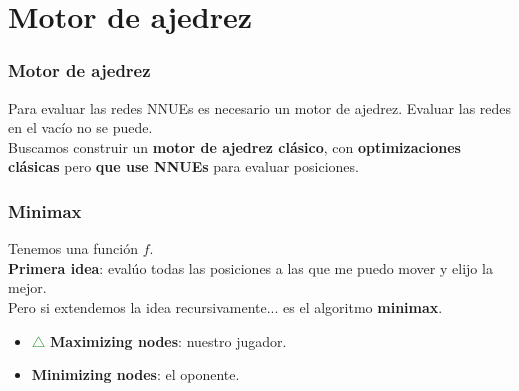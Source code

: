 
\section{Motor de ajedrez}

\begin{frame}
\frametitle{Motor de ajedrez}
Para evaluar las redes NNUEs es necesario un motor de ajedrez. Evaluar las redes en el vacío no se puede. \pause \\
\vspace{1em}
Buscamos construir un \textbf{motor de ajedrez clásico}, con \textbf{optimizaciones clásicas} pero \textbf{que use NNUEs} para evaluar posiciones.
\end{frame}

\begin{frame}
\frametitle{Minimax}
Tenemos una función $f$. \\ \pause
\vspace{1em}
\textbf{Primera idea}: evalúo todas las posiciones a las que me puedo mover y elijo la mejor. \\
\vspace{1em}
\pause
Pero si extendemos la idea recursivamente... es el algoritmo \textbf{minimax}.
\begin{itemize}
\item \textcolor{ForestGreen}{$\triangle$} \textbf{Maximizing nodes}: nuestro jugador.
\item \textcolor{red}{} \textbf{Minimizing nodes}: el oponente.
\end{itemize}
\end{frame}

